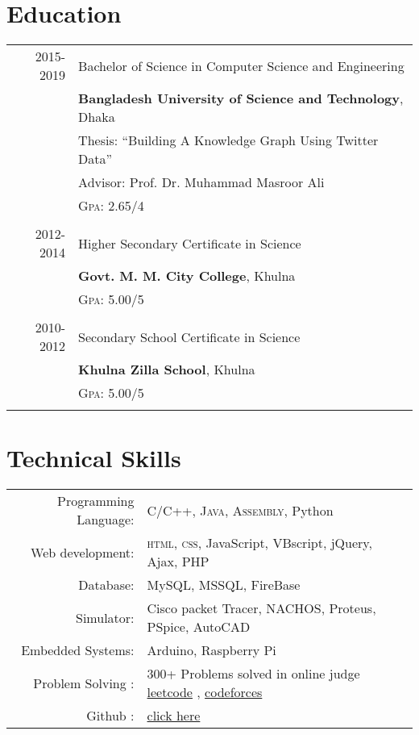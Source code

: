 \documentclass[a4paper,10pt]{article}
\begin{document}
\section{Education}
\begin{tabular}{rl}	


\textsc{} 2015-2019 & Bachelor of Science in Computer Science and Engineering\\ 
& \textbf{Bangladesh University of Science and Technology}, Dhaka\\
& Thesis: ``Building A Knowledge Graph Using Twitter Data'' \\& \small Advisor: Prof. Dr. Muhammad Masroor Ali \\
&\normalsize \textsc{Gpa}: 2.65/4\\&\\

\textsc{} 2012-2014 & Higher Secondary Certificate in  Science \\
& \textbf{Govt. M. M. City College}, Khulna\\
&\normalsize \textsc{Gpa}: 5.00/5\\&\\

\textsc{} 2010-2012 & Secondary School Certificate in  Science \\
& \textbf{Khulna Zilla School}, Khulna\\
&\normalsize \textsc{Gpa}: 5.00/5\\&\\

\end{tabular}
\section{Technical Skills}
\begin{tabular}{rl}
 Programming Language:& \textsc{C/C++}, \textsc{Java}, \textsc{Assembly}, Python\\
Web development:& \textsc{html}, \textsc{css}, JavaScript, VBscript, jQuery, Ajax, PHP\\
Database: & MySQL, MSSQL, FireBase\\
Simulator: & Cisco packet Tracer, NACHOS, Proteus, PSpice, AutoCAD\\
Embedded Systems: & Arduino, Raspberry Pi \\
Problem Solving :& 300+ Problems solved in online judge
\href{https://leetcode.com/an1ndya}{leetcode} ,
\href{https://codeforces.com/profile/an1ndya}{codeforces}     
\\
Github : & \href{https://github.com/An1ndya}{click here}\\
\end{tabular}
\end{document}
